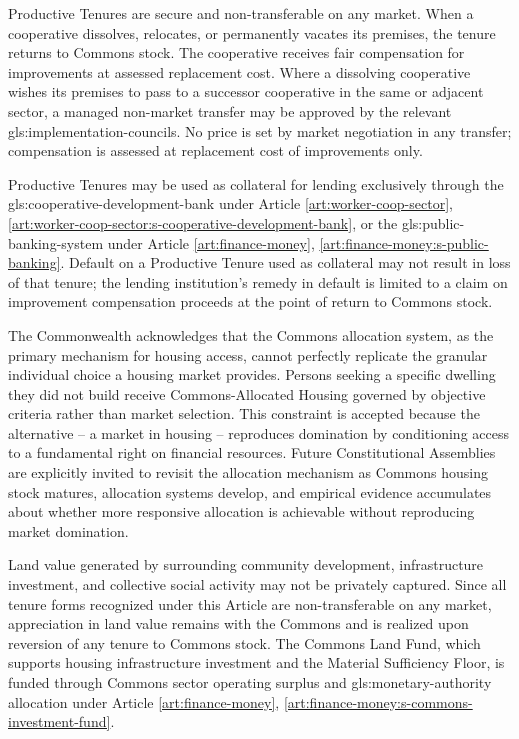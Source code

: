 Productive Tenures are secure and non-transferable on any market. When a cooperative dissolves, relocates, or permanently vacates its premises, the tenure returns to Commons stock. The cooperative receives fair compensation for improvements at assessed replacement cost. Where a dissolving cooperative wishes its premises to pass to a successor cooperative in the same or adjacent sector, a managed non-market transfer may be approved by the relevant \gls{gls:implementation-councils}. No price is set by market negotiation in any transfer; compensation is assessed at replacement cost of improvements only.

Productive Tenures may be used as collateral for lending exclusively through the \gls{gls:cooperative-development-bank} under Article \ref{art:worker-coop-sector}, \ref{art:worker-coop-sector:s-cooperative-development-bank}, or the \gls{gls:public-banking-system} under Article \ref{art:finance-money}, \ref{art:finance-money:s-public-banking}. Default on a Productive Tenure used as collateral may not result in loss of that tenure; the lending institution's remedy in default is limited to a claim on improvement compensation proceeds at the point of return to Commons stock.

The Commonwealth acknowledges that the Commons allocation system, as the primary mechanism for housing access, cannot perfectly replicate the granular individual choice a housing market provides. Persons seeking a specific dwelling they did not build receive Commons-Allocated Housing governed by objective criteria rather than market selection. This constraint is accepted because the alternative -- a market in housing -- reproduces domination by conditioning access to a fundamental right on financial resources. Future Constitutional Assemblies are explicitly invited to revisit the allocation mechanism as Commons housing stock matures, allocation systems develop, and empirical evidence accumulates about whether more responsive allocation is achievable without reproducing market domination.

Land value generated by surrounding community development, infrastructure investment, and collective social activity may not be privately captured. Since all tenure forms recognized under this Article are non-transferable on any market, appreciation in land value remains with the Commons and is realized upon reversion of any tenure to Commons stock. The Commons Land Fund, which supports housing infrastructure investment and the Material Sufficiency Floor, is funded through Commons sector operating surplus and \gls{gls:monetary-authority} allocation under Article \ref{art:finance-money}, \ref{art:finance-money:s-commons-investment-fund}.

